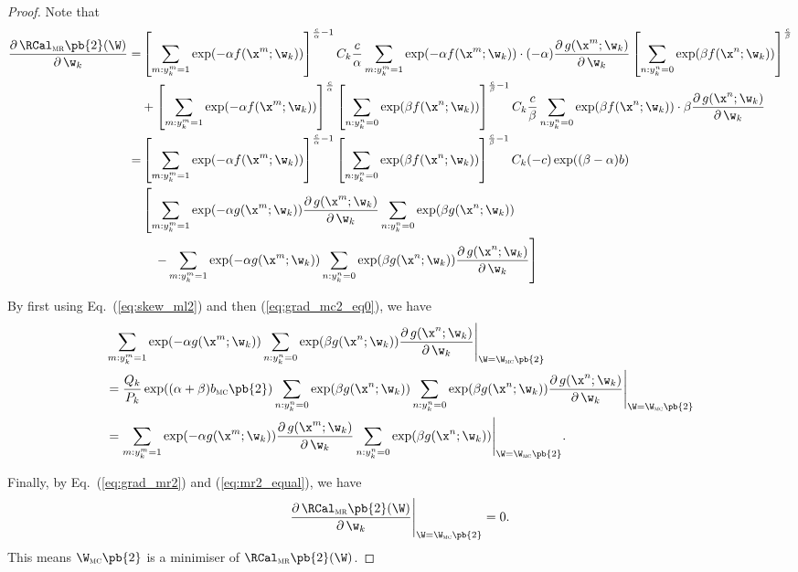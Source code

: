 \begin{proof}
Note that
\begin{equation}
\label{eq:grad_mr2}
\begin{aligned}
\frac{\partial \, \RCal_\textsc{mr}\pb{2}(\W)} {\partial \, \w_k}
=& \left[ \sum_{m: y_k^m = 1} \exp(-\alpha f(\x^m; \w_k)) \right]^{\frac{c}{\alpha} - 1} C_k \frac{c}{\alpha} 
   \sum_{m: y_k^m = 1} \exp(-\alpha f(\x^m; \w_k)) \cdot (-\alpha) 
   \frac{\partial \, g(\x^m; \w_k)}{\partial \, \w_k}
   \left[ \sum_{n: y_k^n = 0} \exp( \beta  f(\x^n; \w_k)) \right]^\frac{c}{\beta} \\
 & + 
   \left[ \sum_{m: y_k^m = 1} \exp(-\alpha f(\x^m; \w_k)) \right]^\frac{c}{\alpha}
   \left[ \sum_{n: y_k^n = 0} \exp( \beta  f(\x^n; \w_k)) \right]^{\frac{c}{\beta} - 1} C_k \frac{c}{\beta}
   \sum_{n: y_k^n = 0} \exp( \beta  f(\x^n; \w_k)) \cdot \beta 
   \frac{\partial \, g(\x^n; \w_k)}{\partial \, \w_k} \\
=& \left[ \sum_{m: y_k^m = 1} \exp(-\alpha f(\x^m; \w_k)) \right]^{\frac{c}{\alpha} - 1}
   \left[ \sum_{n: y_k^n = 0} \exp( \beta  f(\x^n; \w_k)) \right]^{\frac{c}{\beta} - 1}
   C_k (-c) \exp((\beta - \alpha) b) \\
 & \left[ 
   \sum_{m: y_k^m = 1} \exp(-\alpha g(\x^m; \w_k))
   \frac{\partial \, g(\x^m; \w_k)}{\partial \, \w_k}
   \sum_{n: y_k^n = 0} \exp( \beta  g(\x^n; \w_k)) \right. \\
 & \quad \left. - 
   \sum_{m: y_k^m = 1} \exp(-\alpha g(\x^m; \w_k))
   \sum_{n: y_k^n = 0} \exp( \beta  g(\x^n; \w_k))
   \frac{\partial \, g(\x^n; \w_k)}{\partial \, \w_k} \right]
\end{aligned}
\end{equation}

By first using Eq.~(\ref{eq:skew_ml2}) and then (\ref{eq:grad_mc2_eq0}), we have
\begin{equation}
\label{eq:mr2_equal}
\begin{aligned}
&  \sum_{m: y_k^m = 1} \exp(-\alpha g(\x^m; \w_k))
   \sum_{n: y_k^n = 0} \exp( \beta  g(\x^n; \w_k))
   \frac{\partial \, g(\x^n; \w_k)}{\partial \, \w_k}
   \Bigg|_{\W = \W_\textsc{mc}\pb{2}} \\
&= \frac{Q_k}{P_k} \exp((\alpha + \beta) b_\textsc{mc}\pb{2}) \sum_{n: y_k^n = 0} \exp( \beta g(\x^n; \w_k))
   \sum_{n: y_k^n = 0} \exp( \beta  g(\x^n; \w_k))
   \frac{\partial \, g(\x^n; \w_k)}{\partial \, \w_k}
   \Bigg|_{\W = \W_\textsc{mc}\pb{2}} \\
&= \sum_{m: y_k^m = 1} \exp(-\alpha g(\x^m; \w_k))
   \frac{\partial \, g(\x^m; \w_k)}{\partial \, \w_k}
   \sum_{n: y_k^n = 0} \exp( \beta  g(\x^n; \w_k))
   \Bigg|_{\W = \W_\textsc{mc}\pb{2}}.
\end{aligned}
\end{equation}

Finally, by Eq.~(\ref{eq:grad_mr2}) and (\ref{eq:mr2_equal}), we have
$$
\frac{\partial \, \RCal_\textsc{mr}\pb{2}(\W)} {\partial \, \w_k} \Bigg|_{\W = \W_\textsc{mc}\pb{2}} = 0.
$$
This means $\W_\textsc{mc}\pb{2}$ is a minimiser of $\RCal_\textsc{mr}\pb{2}(\W)$.
\end{proof}



